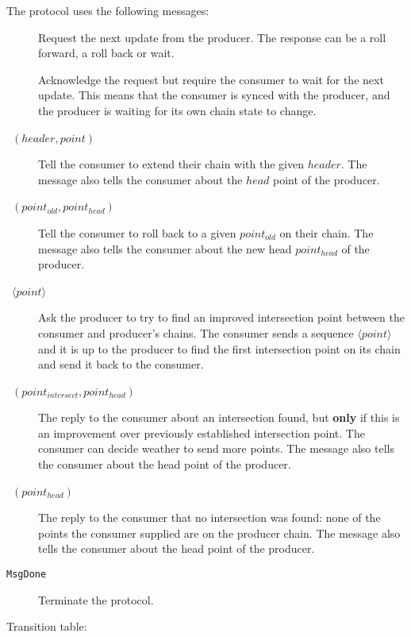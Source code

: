 \documentclass{report}
\newcommand{\msg}[1]{\texttt{#1}}
\newcommand{\MsgDone}{\msg{MsgDone}}
\theoremstyle{definition}{
  \newtheorem{lemma}{Lemma}[section] %
  \newtheorem{definition}[lemma]{Definition}
}
\theoremstyle{theorem}{
  \newtheorem{invariant}[lemma]{Invariant}
  \newtheorem{proofobligation}[lemma]{Proof Obligation}
}
\numberwithin{equation}{lemma}
\begin{document}
The protocol uses the following messages:
\begin{description}
\item [\RequestNext]
      Request the next update from the producer.
      The response can be a roll forward, a roll back or wait.
\item [\AwaitReply]
      Acknowledge the request but require the consumer to wait for the next update.
      This means that the consumer is synced with the producer, and
      the producer is waiting for its own chain state to change.
\item [\RollForward~{\boldmath $(header,point)$}]
      Tell the consumer to extend their chain with the given $header$.
      The message also tells the consumer about the $head$ point of the producer.
\item [\RollBackward~{\boldmath $(point_{old},point_{head})$}]
      Tell the consumer to roll back to a given $point_{old}$ on their chain.
      The message also tells the consumer about the new head $point_{head}$ of the producer.
\item [\FindIntersect~{\boldmath $\langle point \rangle $}]
      Ask the producer to try to find an improved intersection point between
      the consumer and producer's chains.
      The consumer sends a sequence {\boldmath $\langle point \rangle $}
      and it is up to the producer
      to find the first intersection point on its chain and send it back to the consumer.
\item [\IntersectImproved~{\boldmath $(point_{intersect},point_{head})$}]
      The reply to the consumer about an intersection found, but {\bf only} if this
      is an improvement over previously established intersection point.
      The consumer can decide weather to send more points.
      The message also tells the consumer about the head point of the producer.
\item [\IntersectUnchanged~{\boldmath $(point_{head})$}]
      The reply to the consumer that no intersection was found: none of the
      points the consumer supplied are on the producer chain.
      The message also tells the consumer about the head point of the producer.
\item [\MsgDone]
      Terminate the protocol.
\end{description}

Transition table:
\end{document}
